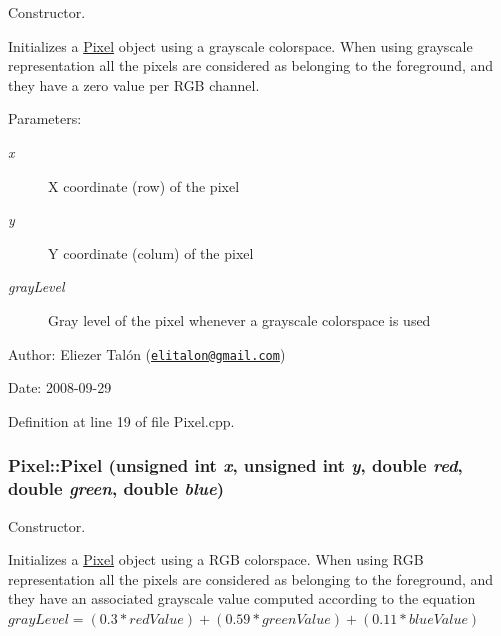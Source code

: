 Constructor. 

Initializes a \hyperlink{class_pixel}{Pixel} object using a grayscale colorspace. When using grayscale representation all the pixels are considered as belonging to the foreground, and they have a zero value per RGB channel.

\begin{Desc}
\item[Parameters:]
\begin{description}
\item[{\em x}]X coordinate (row) of the pixel \item[{\em y}]Y coordinate (colum) of the pixel \item[{\em grayLevel}]Gray level of the pixel whenever a grayscale colorspace is used\end{description}
\end{Desc}
\begin{Desc}
\item[Author:]Eliezer Talón (\href{mailto:elitalon@gmail.com}{\tt elitalon@gmail.com}) \end{Desc}
\begin{Desc}
\item[Date:]2008-09-29 \end{Desc}


Definition at line 19 of file Pixel.cpp.\hypertarget{class_pixel_e5ca1376e87442aea5968a17a4240814}{
\subsubsection[Pixel]{\setlength{\rightskip}{0pt plus 5cm}Pixel::Pixel (unsigned int {\em x}, \/  unsigned int {\em y}, \/  double {\em red}, \/  double {\em green}, \/  double {\em blue})}}
\label{class_pixel_e5ca1376e87442aea5968a17a4240814}


Constructor. 

Initializes a \hyperlink{class_pixel}{Pixel} object using a RGB colorspace. When using RGB representation all the pixels are considered as belonging to the foreground, and they have an associated grayscale value computed according to the equation $grayLevel = (0.3 * redValue) + (0.59 * greenValue) + (0.11 * blueValue) $

